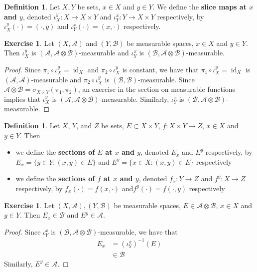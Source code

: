 \documentclass{book}
\theoremstyle{definition}
\newtheorem{defn}[definition]{Definition}
\newtheorem{ex}[definition]{Exercise}
\newcommand{\sig}{\sigma}
\newcommand{\MA}{\mathcal{A}}
\newcommand{\MB}{\mathcal{B}}
\newcommand{\lex}[1]{\label{ex:#1}}
\newcommand{\ld}[1]{\label{defn:#1}}
\DeclareMathOperator{\id}{id}
\DeclareMathOperator*{\0}{\mbf{0}}
\DeclareMathOperator*{\1}{\mbf{1}}
\begin{document}
	\begin{defn} \ld{25010}
		Let $X, Y$ be sets, $x \in X$ and $y \in Y$. We define the \textbf{slice maps at $x$ and $y$}, denoted $\iota^y_X: X \rightarrow X \times Y$ and $\iota^x_Y: Y \rightarrow X \times Y$ respectively, by $\iota^y_X(\cdot) = (\cdot, y)$ and $\iota^x_Y(\cdot) = (x, \cdot)$ respectively. 
	\end{defn}
	
	\begin{ex} \lex{25011}
		Let $(X, \MA )$ and $(Y, \MB)$ be measurable spaces, $x \in X$ and $y \in Y$. Then $\iota^y_X$ is $(\MA, \MA \otimes \MB)$-measurable and $\iota^x_Y$  is $(\MB, \MA \otimes \MB)$-measurable.
	\end{ex}
	
	\begin{proof}
		Since $\pi_1 \circ \iota^y_X = \id_{X}$ and $\pi_2 \circ \iota^y_X$ is constant, we have that $\pi_1 \circ \iota^y_X = \id_{X}$ is $(\MA, \MA)$-measurable and $\pi_2 \circ \iota^y_X$ is $(\MB, \MB)$-measurable. Since $\MA \otimes \MB = \sig_{X \times Y}(\pi_1, \pi_2)$, an exercise in the section on measurable functions implies that $\iota^y_X$ is $(\MA, \MA \otimes \MB)$-measurable. Similarly, $\iota^x_Y$ is $(\MB, \MA \otimes \MB)$-measurable.
	\end{proof}
	
	\begin{defn} \ld{25012} 
		Let $X$, $Y$, and $Z$ be sets, $E \subset X \times Y$, $f :X \times Y \rightarrow Z$, $x \in X$ and $y \in Y$. Then
		\begin{itemize}
			\item we define the \textbf{sections of $E$ at $x$ and $y$}, denoted $E_x$ and $E^y$ respectively, by $E_x = \{y \in Y: (x,y) \in E\}$ and $E^y = \{x \in X: (x,y) \in E\}$ respectively
			\item we define the \textbf{sections of $f$ at $x$ and $y$}, denoted $f_x:Y \rightarrow Z$ and $f^y:X \rightarrow Z$ respectively, by $f_x(\cdot) = f(x,\cdot)$ and$f^y(\cdot) = f(\cdot,y)$  respectively 
		\end{itemize}
	\end{defn}

	\begin{ex} \lex{25013}
		Let $(X,\MA), (Y, \MB)$ be measurable spaces, $E \in \MA \otimes \MB$, $x \in X$ and $y \in Y$. Then $E_x \in \MB$ and $E^y \in \MA$.  
	\end{ex}
	
	\begin{proof}
		Since $\iota^x_Y$ is $(\MB, \MA \otimes \MB)$-measurable, we have that
		\begin{align*}
			E_x 
			& = (\iota^x_Y)^{-1}(E) \\
			& \in \MB 
		\end{align*}
		Similarly, $E^y \in \MA$. 
	\end{proof}
	
\end{document}
